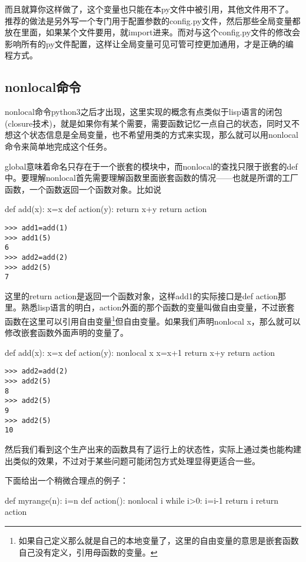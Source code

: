 \documentclass[12pt,oneside]{book}
\begin{document}
\begin{common-format}
而且就算你这样做了，这个变量也只能在本py文件中被引用，其他文件用不了。推荐的做法是另外写一个专门用于配置参数的config.py文件，然后那些全局变量都放在里面，如果某个文件要用，就import进来。而对与这个config.py文件的修改会影响所有的py文件配置，这样让全局变量可见可管可控更加通用，才是正确的编程方式。


\subsection{nonlocal命令}
nonlocal命令python3之后才出现，这里实现的概念有点类似于lisp语言的闭包(closure技术)，就是如果你有某个需要，需要函数记忆一点自己的状态，同时又不想这个状态信息是全局变量，也不希望用类的方式来实现，那么就可以用nonlocal命令来简单地完成这个任务。

global意味着命名只存在于一个嵌套的模块中，而nonlocal的查找只限于嵌套的def中。要理解nonlocal首先需要理解函数里面嵌套函数的情况——也就是所谓的工厂函数，一个函数返回一个函数对象。比如说
\begin{tcbpython}
def add(x):
    x=x
    def action(y):
        return x+y
    return action
\end{tcbpython}
\begin{Verbatim}
>>> add1=add(1)
>>> add1(5)
6
>>> add2=add(2)
>>> add2(5)
7
\end{Verbatim}
这里的return action是返回一个函数对象，这样add1的实际接口是def action那里。熟悉lisp语言的明白，action外面的那个函数的变量叫做自由变量，不过嵌套函数在这里可以引用自由变量\footnote{如果自己定义那么就是自己的本地变量了，这里的自由变量的意思是嵌套函数自己没有定义，引用母函数的变量。}但自由变量。如果我们声明nonlocal x，那么就可以修改嵌套函数外面声明的变量了。

\begin{tcbpython}
def add(x):
    x=x
    def action(y):
        nonlocal x
        x=x+1
        return x+y
    return action
\end{tcbpython}
\begin{Verbatim}
>>> add2=add(2)
>>> add2(5)
8
>>> add2(5)
9
>>> add2(5)
10
\end{Verbatim}
然后我们看到这个生产出来的函数具有了运行上的状态性，实际上通过类也能构建出类似的效果，不过对于某些问题可能闭包方式处理显得更适合一些。

下面给出一个稍微合理点的例子：
\begin{tcbpython}
def myrange(n):
    i=n
    def action():
        nonlocal i
        while i>0:
            i=i-1
            return i
    return action
\end{tcbpython}


\end{common-format}
\end{document}
